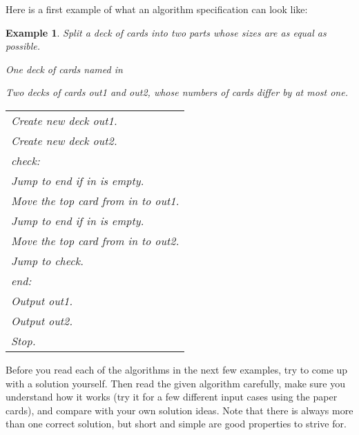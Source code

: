 \documentclass[a4paper,twoside]{tufte-handout}
\newtheorem{example}{Example}
\newcommand\lbl[1]{\hspace{-1em}\emph{#1:}}
\begin{document}
Here is a first example of what an algorithm specification can look like:

\begin{example}
  Split a deck of cards into two parts whose sizes are as equal as possible.
  \begin{description}
  \item[Input:] One deck of cards named \emph{in}
  \item[Output:] Two decks of cards \emph{out1} and \emph{out2},
    whose numbers of cards differ by at most one.
 \item[Algorithm:]
  \item\normalfont
    \begin{tabular}{l}
      Create new deck \emph{out1}.\\
      Create new deck \emph{out2}.\\
      \lbl{check}\\
      Jump to \emph{end} if \emph{in} is empty.\\
      Move the top card from \emph{in} to \emph{out1}.\\
      Jump to \emph{end} if \emph{in} is empty.\\
      Move the top card from \emph{in} to \emph{out2}.\\
      Jump to \emph{check}.\\
      \lbl{end}\\
      Output \emph{out1}.\\
      Output \emph{out2}.\\
      Stop.
    \end{tabular}
  \end{description}
\end{example}

Before you read each of the algorithms in the next few examples, try
to come up with a solution yourself. Then read the given algorithm
carefully, make sure you understand how it works (try it for a few
different input cases using the paper cards), and compare with your
own solution ideas. Note that there is always more than one correct
solution, but short and simple are good properties to strive for.
\end{document}
